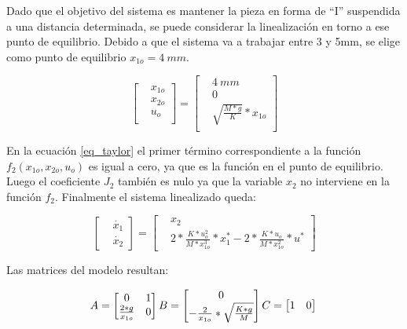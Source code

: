 Dado que el objetivo del sistema es mantener la pieza en forma de “I”  suspendida a una distancia determinada, se puede considerar la linealización en torno a ese punto de equilibrio. Debido a que el sistema va a trabajar entre 3 y 5mm, se elige como punto de equilibrio $x_{1o}=4\:mm$.

\begin{equation*}
\begin{bmatrix}
		&x_{1o}\\
		&x_{2o}\\
		&u_{o}\\
\end{bmatrix}
=
\begin{bmatrix}
	&4\:mm\\
	&0\\
	&\sqrt{\frac{M*g}{K}}*x_{1o}\\
\end{bmatrix}
\end{equation*}

En la ecuación \ref{eq_taylor} el primer término correspondiente a la función $f_2(x_{1o},x_{2o},u_o)$ es igual a cero, ya que es la función en el punto de equilibrio. Luego el coeficiente $J_2$ también es nulo ya que la variable $x_2$ no interviene en la función $f_2$. Finalmente el sistema linealizado queda: 


\begin{equation*} 
	\begin{bmatrix}
		&\dot{x_{1}}\\
		&\dot{x_{2}}
	\end{bmatrix}
	=
	\begin{bmatrix}
		&x_{2}\\
		&2*\frac{K*u_{o}^{2}}{M*x_{1o}^{3}}*x_1^*-2*\frac{K*u_{o}}{M*x_{1o}^{2}}*u^*
	\end{bmatrix}
\end{equation*}

\noindent Las matrices del modelo resultan:

\begin{equation*}
	A=
	\begin{bmatrix}
		0 & 1\\
		\frac{2*g}{x_{1o}} & 0
	\end{bmatrix}\\
	  B=
	\begin{bmatrix}
	0\\
	-\frac{2}{x_{1o}}*\sqrt{\frac{K*g}{M}}
	\end{bmatrix}\\
	  C=
	\begin{bmatrix}
	1 & 0\\
	\end{bmatrix}\\
\end{equation*}




